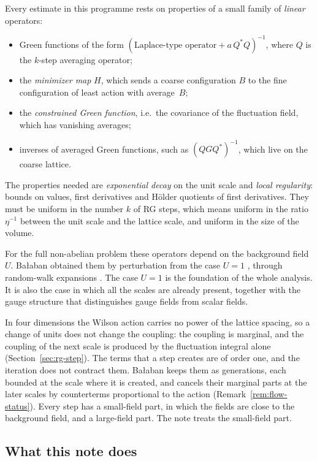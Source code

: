 Every estimate in this programme rests on properties of a small family of \emph{linear} operators:
\begin{itemize}
\item Green functions of the form $(\text{Laplace-type operator}+a\,Q^*Q)^{-1}$, where $Q$ is the $k$-step averaging operator;
\item the \emph{minimizer map} $H$, which sends a coarse configuration $B$ to the fine configuration of least action with average~$B$;
\item the \emph{constrained Green function}, i.e.\ the covariance of the fluctuation field, which has vanishing averages;
\item inverses of averaged Green functions, such as $(QGQ^*)^{-1}$, which live on the coarse lattice.
\end{itemize}
The properties needed are \emph{exponential decay} on the unit scale and \emph{local regularity}: bounds on values, first derivatives and H\"older quotients of first derivatives. They must be uniform in the number $k$ of RG steps, which means uniform in the ratio $\eta^{-1}$ between the unit scale and the lattice scale, and uniform in the size of the volume.

For the full non-abelian problem these operators depend on the background field $U$. Ba\l aban obtained them by perturbation from the case $U=1$ \cite{BalPropI}, through random-walk expansions \cite{BalPropII,BalBackground}. The case $U=1$ is the foundation of the whole analysis. It is also the case in which all the scales are already present, together with the gauge structure that distinguishes gauge fields from scalar fields.

In four dimensions the Wilson action carries no power of the lattice spacing, so a change of units does not change the coupling: the coupling is marginal, and the coupling of the next scale is produced by the fluctuation integral alone (Section~\ref{sec:rg-step}). The terms that a step creates are of order one, and the iteration does not contract them. Ba\l aban keeps them as generations, each bounded at the scale where it is created, and cancels their marginal parts at the later scales by counterterms proportional to the action \cite{BalYM4I,BalYM4II} (Remark~\ref{rem:flow-status}). Every step has a small-field part, in which the fields are close to the background field, and a large-field part. The note treats the small-field part.

\subsection{What this note does}\label{ss:1.2}

